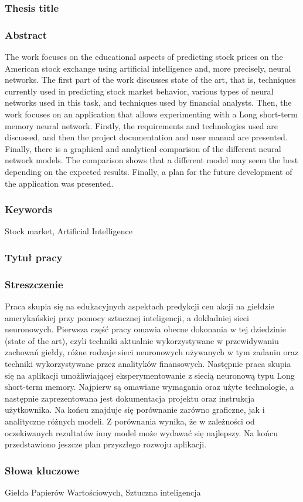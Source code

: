 \subsubsection*{Thesis title} \Title

\subsubsection*{Abstract}  
The work focuses on the educational aspects of predicting stock prices on the American stock exchange using artificial intelligence and, more precisely, neural networks. The first part of the work discusses state of the art, that is, techniques currently used in predicting stock market behavior, various types of neural networks used in this task, and techniques used by financial analysts. Then, the work focuses on an application that allows experimenting with a Long short-term memory neural network. Firstly, the requirements and technologies used are discussed, and then the project documentation and user manual are presented. Finally, there is a graphical and analytical comparison of the different neural network models. The comparison shows that a different model may seem the best depending on the expected results. Finally, a plan for the future development of the application was presented.

\subsubsection*{Keywords} 
Stock market, Artificial Intelligence

\subsubsection*{Tytuł pracy} 
\begin{otherlanguage}{polish}
\TitleAlt
\end{otherlanguage}

\subsubsection*{Streszczenie} 
\begin{otherlanguage}{polish}
    Praca skupia się na edukacyjnych aspektach predykcji cen akcji na giełdzie amerykańskiej przy pomocy sztucznej inteligencji, a dokładniej sieci neuronowych. Pierwsza część pracy omawia obecne dokonania w tej dziedzinie (state of the art), czyli techniki aktualnie wykorzystywane w przewidywaniu zachowań giełdy, różne rodzaje sieci neuronowych używanych w tym zadaniu oraz techniki wykorzystywane przez analityków finansowych. Następnie praca skupia się na aplikacji umożliwiającej eksperymentowanie z siecią neuronową typu Long short-term memory. Najpierw są omawiane wymagania oraz użyte technologie, a następnie zaprezentowana jest dokumentacja projektu oraz instrukcja użytkownika. Na końcu znajduje się porównanie zarówno graficzne, jak i analityczne różnych modeli. Z porównania wynika, że w zależności od oczekiwanych rezultatów inny model może wydawać się najlepszy. Na końcu przedstawiono jeszcze plan przyszłego rozwoju aplikacji.
\end{otherlanguage}
\subsubsection*{Słowa kluczowe}  
\begin{otherlanguage}{polish}
Giełda Papierów Wartościowych, Sztuczna inteligencja
\end{otherlanguage}

